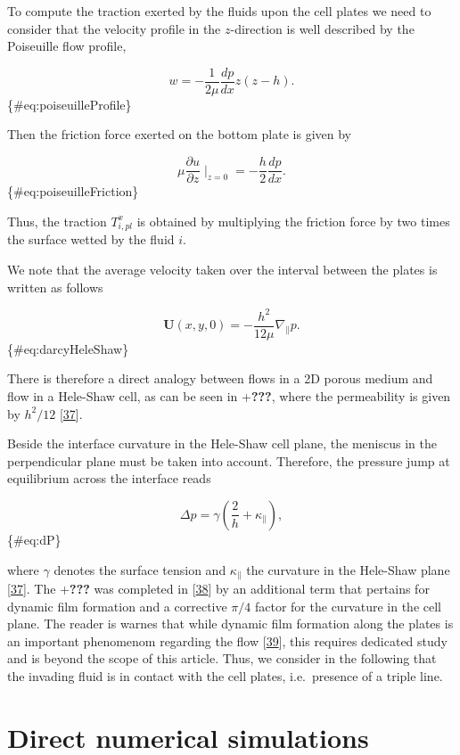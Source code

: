 \documentclass[]{article}
\begin{document}
To compute the traction exerted by the fluids upon the cell plates we
need to consider that the velocity profile in the \(z\)-direction is
well described by the Poiseuille flow profile,

\[
w=-\frac{1}{2\mu}\frac{dp}{dx}z(z-h).
\] \{\#eq:poiseuilleProfile\}

Then the friction force exerted on the bottom plate is given by

\[
\mu\frac{\partial u}{\partial z}\mid_{z=0}=-\frac{h}{2}\frac{dp}{dx}.
\] \{\#eq:poiseuilleFriction\}

Thus, the traction \(T_{i,pl}^x\) is obtained by multiplying the
friction force by two times the surface wetted by the fluid \(i\).

We note that the average velocity taken over the interval between the
plates is written as follows

\[
\mathbf{U}(x,y,0)=-\frac{h^{2}}{12\mu}\nabla_{\parallel}p.
\] \{\#eq:darcyHeleShaw\}

There is therefore a direct analogy between flows in a 2D porous medium
and flow in a Hele-Shaw cell, as can be seen in +\textbf{???}, where the
permeability is given by \(h^{2}/12\)
{[}\protect\hyperlink{ref-saffman1958penetration}{37}{]}.

Beside the interface curvature in the Hele-Shaw cell plane, the meniscus
in the perpendicular plane must be taken into account. Therefore, the
pressure jump at equilibrium across the interface reads

\[
\Delta p = \gamma \left(\frac{2}{h}+\kappa_{\parallel}\right),
\] \{\#eq:dP\}

where \(\gamma\) denotes the surface tension and \(\kappa_{\parallel}\)
the curvature in the Hele-Shaw plane
{[}\protect\hyperlink{ref-saffman1958penetration}{37}{]}. The
+\textbf{???} was completed in
{[}\protect\hyperlink{ref-park1984two}{38}{]} by an additional term that
pertains for dynamic film formation and a corrective \(\pi/4\) factor
for the curvature in the cell plane. The reader is warnes that while
dynamic film formation along the plates is an important phenomenom
regarding the flow {[}\protect\hyperlink{ref-jackson2015dynamic}{39}{]},
this requires dedicated study and is beyond the scope of this article.
Thus, we consider in the following that the invading fluid is in contact
with the cell plates, i.e.~presence of a triple line.

\hypertarget{direct-numerical-simulations}{%
\section{Direct numerical
simulations}\label{direct-numerical-simulations}}
\end{document}
